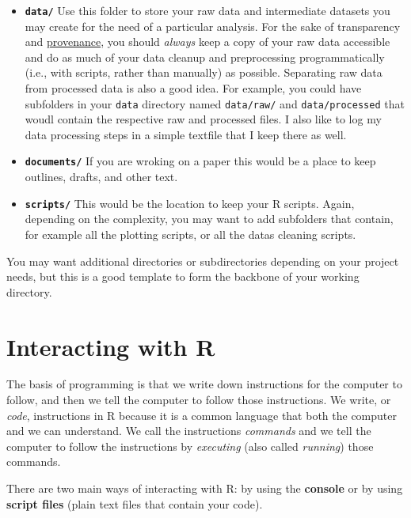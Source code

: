 \documentclass[
]{book}
\providecommand{\tightlist}{%
  \setlength{\itemsep}{0pt}\setlength{\parskip}{0pt}}
\begin{document}
\begin{itemize}
\tightlist
\item
  \textbf{\texttt{data/}} Use this folder to store your raw data and intermediate
  datasets you may create for the need of a particular analysis. For the sake
  of transparency and \href{https://en.wikipedia.org/wiki/Provenance}{provenance},
  you should \emph{always} keep a copy of your raw data accessible and do as much
  of your data cleanup and preprocessing programmatically (i.e., with scripts,
  rather than manually) as possible. Separating raw data from processed data
  is also a good idea. For example, you could have subfolders in your \texttt{data} directory named
  \texttt{data/raw/}
  and \texttt{data/processed} that woudl contain the respective raw and processed files. I also like to log my data processing steps in a simple textfile that I keep there as well.
\item
  \textbf{\texttt{documents/}} If you are wroking on a paper this would be a place to keep outlines, drafts, and other
  text.
\item
  \textbf{\texttt{scripts/}} This would be the location to keep your R scripts. Again, depending on the complexity, you may want to add subfolders that contain, for example all the plotting scripts, or all the datas cleaning scripts.
\end{itemize}

You may want additional directories or subdirectories depending on your project
needs, but this is a good template to form the backbone of your working directory.

\hypertarget{interacting-with-r}{%
\section{Interacting with R}\label{interacting-with-r}}

The basis of programming is that we write down instructions for the computer to
follow, and then we tell the computer to follow those instructions. We write, or
\emph{code}, instructions in R because it is a common language that both the computer
and we can understand. We call the instructions \emph{commands} and we tell the
computer to follow the instructions by \emph{executing} (also called \emph{running}) those
commands.

There are two main ways of interacting with R: by using the \textbf{console} or by using
\textbf{script files} (plain text files that contain your code).
\end{document}
